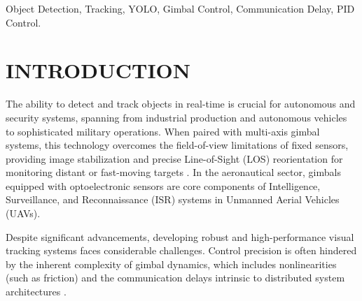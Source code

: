 \documentclass[conference]{IEEEtran}
\begin{document}
\begin{abstract}
The capability for real-time object detection and tracking has become fundamental for autonomous and security systems. Integrating this technology with multi-axis gimbal systems significantly elevates performance, providing image stabilization and precise tracking. This work proposes the development of a comprehensive and robust control solution for object tracking in real-time acquired images using a two-degree-of-freedom (2-DOF) gimbal platform. The contributions include an integrated system architecture uniting visual perception (YOLOv8), data communication, and motion control. The system model modularly incorporates critical nonlinearities such as Coulomb friction and the combined controller and actuator delay. Validation through real-time simulation, considering a total application latency of 124 ms, demonstrates the viability of a stable and responsive platform. The developed PID control system was capable of stabilizing the gimbal's rotational axes, effectively tracking the zero reference (image center) with a settling time of approximately 5 s.
\end{abstract}

\begin{IEEEkeywords}
Object Detection, Tracking, YOLO, Gimbal Control, Communication Delay, PID Control.
\end{IEEEkeywords}

\section{INTRODUCTION}
The ability to detect and track objects in real-time is crucial for autonomous and security systems, spanning from industrial production and autonomous vehicles to sophisticated military operations. When paired with multi-axis gimbal systems, this technology overcomes the field-of-view limitations of fixed sensors, providing image stabilization and precise Line-of-Sight (LOS) reorientation for monitoring distant or fast-moving targets \cite{GimbalYOLO}. In the aeronautical sector, gimbals equipped with optoelectronic sensors are core components of Intelligence, Surveillance, and Reconnaissance (ISR) systems in Unmanned Aerial Vehicles (UAVs).

Despite significant advancements, developing robust and high-performance visual tracking systems faces considerable challenges. Control precision is often hindered by the inherent complexity of gimbal dynamics, which includes nonlinearities (such as friction) \cite{espinosa2016diseno} and the communication delays intrinsic to distributed system architectures \cite{TONG2020105312, KIESEL2022238}. 
\end{document}
